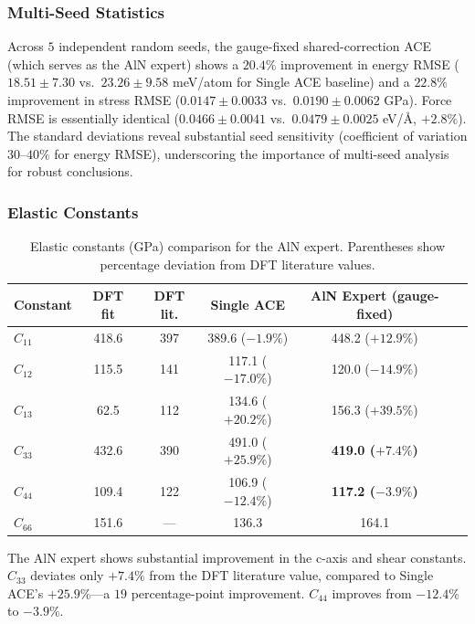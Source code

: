 \documentclass[twoside,prb,aps,floatfix,superscriptaddress,longbibliography]{revtex4-2}
\newcommand{\AAng}{\mbox{\AA}}
\begin{document}
\subsubsection{Multi-Seed Statistics}

Across $5$ independent random seeds, the gauge-fixed shared-correction ACE (which serves as the AlN expert) shows a $20.4\%$ improvement in energy RMSE ($18.51 \pm 7.30$ vs.\ $23.26 \pm 9.58$ meV/atom for Single ACE baseline) and a $22.8\%$ improvement in stress RMSE ($0.0147 \pm 0.0033$ vs.\ $0.0190 \pm 0.0062$ GPa). Force RMSE is essentially identical ($0.0466 \pm 0.0041$ vs.\ $0.0479 \pm 0.0025$ eV/\AAng, $+2.8\%$). The standard deviations reveal substantial seed sensitivity (coefficient of variation $30$--$40\%$ for energy RMSE), underscoring the importance of multi-seed analysis for robust conclusions.

\subsubsection{Elastic Constants}

\begin{table}[t]
\caption{Elastic constants (GPa) comparison for the AlN expert. Parentheses show percentage deviation from DFT literature values.}
\label{tab:elastic}
\begin{ruledtabular}
\begin{tabular}{lccccc}
\toprule
Constant & DFT fit & DFT lit. & Single ACE & AlN Expert (gauge-fixed) \\
\midrule
$C_{11}$ & 418.6 & 397 & 389.6 ($-1.9\%$) & 448.2 ($+12.9\%$) \\
$C_{12}$ & 115.5 & 141 & 117.1 ($-17.0\%$) & 120.0 ($-14.9\%$) \\
$C_{13}$ & 62.5 & 112 & 134.6 ($+20.2\%$) & 156.3 ($+39.5\%$) \\
$C_{33}$ & 432.6 & 390 & 491.0 ($+25.9\%$) & \textbf{419.0 ($+7.4\%$)} \\
$C_{44}$ & 109.4 & 122 & 106.9 ($-12.4\%$) & \textbf{117.2 ($-3.9\%$)} \\
$C_{66}$ & 151.6 & --- & 136.3 & 164.1 \\
\bottomrule
\end{tabular}
\end{ruledtabular}
\end{table}

The AlN expert shows substantial improvement in the c-axis and shear constants. $C_{33}$ deviates only $+7.4\%$ from the DFT literature value, compared to Single ACE's $+25.9\%$---a $19$ percentage-point improvement. $C_{44}$ improves from $-12.4\%$ to $-3.9\%$.
\end{document}
